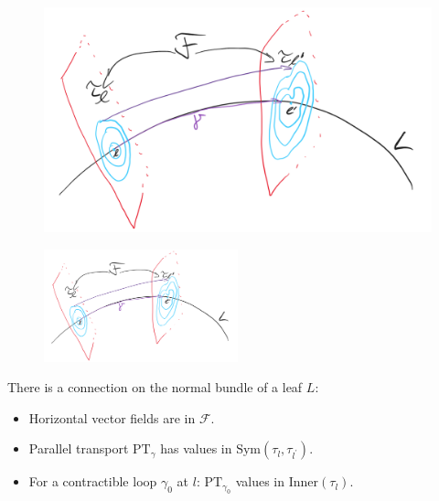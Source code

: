 \documentclass[hyperref={pdfpagelabels=false}]{beamer}
\newcommand\insertreferences{}
\theoremstyle{plain}
\theoremstyle{remark}
\begin{document}
\renewcommand\insertreferences{{\tiny Camille Laurent-Gengoux and Leonid Ryvkin, The holonomy of a singular leaf, \newline \textit{Selecta Mathematica 28}, no.\ 2, 45, 2022.}}

\begin{frame}
\begin{figure}[htbp]
	\centering
		\includegraphics[width=1.00\textwidth]{Foliation connection.png}
	\label{fig:Foliation connection}
\end{figure}

\end{frame}

\begin{frame}
\begin{figure}[htbp]
	\centering
		\includegraphics[width=0.50\textwidth]{Foliation connection.png}
	\label{fig:Foliation connection Zwei}
\end{figure}

\begin{theorem}
There is a connection on the normal bundle of a leaf $L$:
\begin{itemize}
	\item Horizontal vector fields are in $\mathcal{F}$.
	\item Parallel transport $\mathup{PT}_\gamma$ has values in $\mathup{Sym}(\tau_l, \tau_{l^\prime})$.
	\item For a contractible loop $\gamma_0$ at $l$: $\mathup{PT}_{\gamma_0}$ values in $\mathup{Inner}(\tau_l)$.
\end{itemize}
\end{theorem}

\end{frame}
\end{document}
